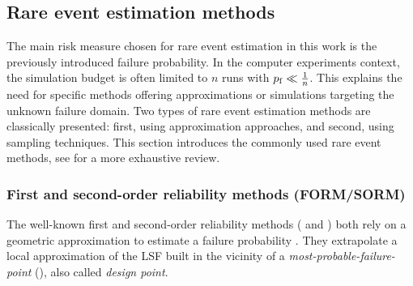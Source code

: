 \subsection{Rare event estimation methods}\label{sec:rare_event}

The main risk measure chosen for rare event estimation in this work is the previously introduced failure probability. 
In the computer experiments context, the simulation budget is often limited to $n$ runs with $p_\mathrm{f} \ll \frac1n$. 
This explains the need for specific methods offering approximations or simulations targeting the unknown failure domain. 
Two types of rare event estimation methods are classically presented: first, using approximation approaches, and second, using sampling techniques. 
This section introduces the commonly used rare event methods, see \cite{MorioBalesdent2015} for a more exhaustive review.


\subsubsection{First and second-order reliability methods (FORM/SORM)}

The well-known first and second-order reliability methods ( and ) both rely on a geometric approximation to estimate a failure probability \citep{lemaire_2009}. 
They extrapolate a local approximation of the LSF built in the vicinity of a \textit{most-probable-failure-point} (), also called \textit{design point}.

